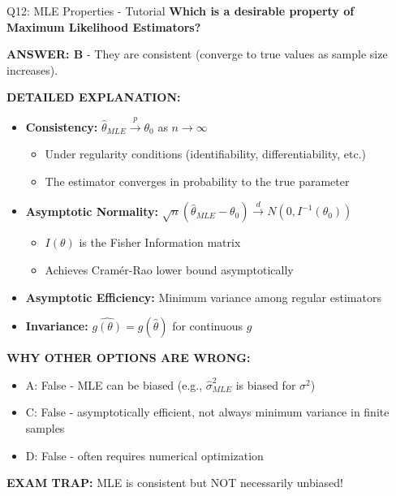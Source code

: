 \documentclass[8pt]{beamer}
\begin{document}
	\begin{frame}{Q12: MLE Properties - Tutorial}
		\fontsize{6.5}{7.5}\selectfont
		\textbf{Which is a desirable property of Maximum Likelihood Estimators?}
		
		\vspace{0.05cm}
		\textcolor{myblue}{\textbf{ANSWER: B}} - They are consistent (converge to true values as sample size increases).
		
		\vspace{0.05cm}
		\textbf{DETAILED EXPLANATION:}
		\begin{itemize}
			\item \textbf{Consistency:} $\hat{\theta}_{MLE} \xrightarrow{p} \theta_0$ as $n \to \infty$
			\begin{itemize}
				\item Under regularity conditions (identifiability, differentiability, etc.)
				\item The estimator converges in probability to the true parameter
			\end{itemize}
			\item \textbf{Asymptotic Normality:} $\sqrt{n}(\hat{\theta}_{MLE} - \theta_0) \xrightarrow{d} N(0, I^{-1}(\theta_0))$
			\begin{itemize}
				\item $I(\theta)$ is the Fisher Information matrix
				\item Achieves Cramér-Rao lower bound asymptotically
			\end{itemize}
			\item \textbf{Asymptotic Efficiency:} Minimum variance among regular estimators
			\item \textbf{Invariance:} $\widehat{g(\theta)} = g(\hat{\theta})$ for continuous $g$
		\end{itemize}
		
		\vspace{0.05cm}
		\textcolor{myred}{\textbf{WHY OTHER OPTIONS ARE WRONG:}}
		\begin{itemize}
			\item \textcolor{myred}{A:} False - MLE can be biased (e.g., $\hat{\sigma}^2_{MLE}$ is biased for $\sigma^2$)
			\item \textcolor{myred}{C:} False - asymptotically efficient, not always minimum variance in finite samples
			\item \textcolor{myred}{D:} False - often requires numerical optimization
		\end{itemize}
		
		\textcolor{myred}{\textbf{EXAM TRAP:}} MLE is \textcolor{myblue}{consistent} but NOT necessarily unbiased!
	\end{frame}
	
\end{document}
